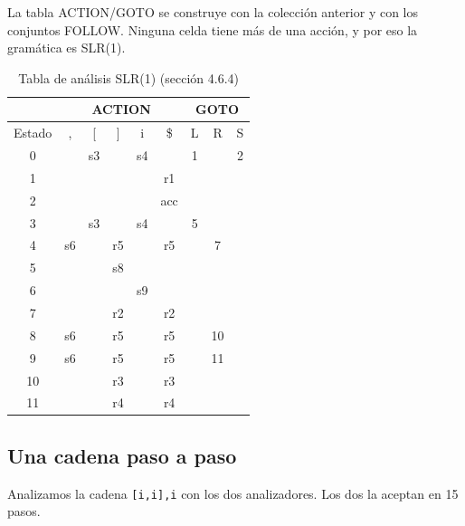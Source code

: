 \documentclass[11pt,a4paper]{article}
\begin{document}
La tabla ACTION/GOTO se construye con la colección anterior y con los conjuntos FOLLOW. Ninguna celda tiene más de una acción, y por eso la gramática es SLR(1).

\begin{table}[ht]
\centering
\small
\caption{Tabla de análisis SLR(1) (sección 4.6.4)}
\begin{tabular}{|c|c|c|c|c|c|c|c|c|}
\hline
\multicolumn{1}{|c|}{} & \multicolumn{5}{c|}{ACTION} & \multicolumn{3}{c|}{GOTO} \\ \hline
Estado & , & {[} & {]} & i & \$ & L & R & S \\ \hline
0 &  & s3 &  & s4 &  & 1 &  & 2 \\ \hline
1 &  &  &  &  & r1 &  &  &  \\ \hline
2 &  &  &  &  & acc &  &  &  \\ \hline
3 &  & s3 &  & s4 &  & 5 &  &  \\ \hline
4 & s6 &  & r5 &  & r5 &  & 7 &  \\ \hline
5 &  &  & s8 &  &  &  &  &  \\ \hline
6 &  &  &  & s9 &  &  &  &  \\ \hline
7 &  &  & r2 &  & r2 &  &  &  \\ \hline
8 & s6 &  & r5 &  & r5 &  & 10 &  \\ \hline
9 & s6 &  & r5 &  & r5 &  & 11 &  \\ \hline
10 &  &  & r3 &  & r3 &  &  &  \\ \hline
11 &  &  & r4 &  & r4 &  &  &  \\ \hline
\end{tabular}
\end{table}


\subsection{Una cadena paso a paso}
Analizamos la cadena \texttt{[i,i],i} con los dos analizadores. Los dos la aceptan en 15 pasos.
\end{document}
